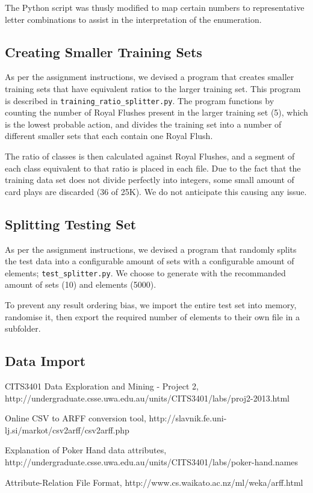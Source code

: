 \documentclass[11pt, a4paper]{article}
\begin{document}
The Python script was thusly modified to map certain numbers to representative letter combinations to assist in the interpretation of the enumeration.

\subsection*{Creating Smaller Training Sets}

As per the assignment instructions, we devised a program that creates smaller training sets that have equivalent ratios to the larger training set. This program is described in \texttt{training\_ratio\_splitter.py}. The program functions by counting the number of Royal Flushes present in the larger training set (5), which is the lowest probable action, and divides the training set into a number of different smaller sets that each contain one Royal Flush.

The ratio of classes is then calculated against Royal Flushes, and a segment of each class equivalent to that ratio is placed in each file. Due to the fact that the training data set does not divide perfectly into integers, some small amount of card plays are discarded (36 of 25K). We do not anticipate this causing any issue.

\subsection*{Splitting Testing Set}

As per the assignment instructions, we devised a program that randomly splits the test data into a configurable amount of sets with a configurable amount of elements; \texttt{test\_splitter.py}. We choose to generate with the recommanded amount of sets (10) and elements (5000).

To prevent any result ordering bias, we import the entire test set into memory, randomise it, then export the required number of elements to their own file in a subfolder.

\subsection*{Data Import}



\begin{thebibliography}{9}

	CITS3401 Data Exploration and Mining - Project 2,
	http://undergraduate.csse.uwa.edu.au/units/CITS3401/labs/proj2-2013.html

	Online CSV to ARFF conversion tool,
	http://slavnik.fe.uni-lj.si/markot/csv2arff/csv2arff.php

	Explanation of Poker Hand data attributes,
	http://undergraduate.csse.uwa.edu.au/units/CITS3401/labs/poker-hand.names

	Attribute-Relation File Format,
	http://www.cs.waikato.ac.nz/ml/weka/arff.html

\end{thebibliography}


\end{document}

